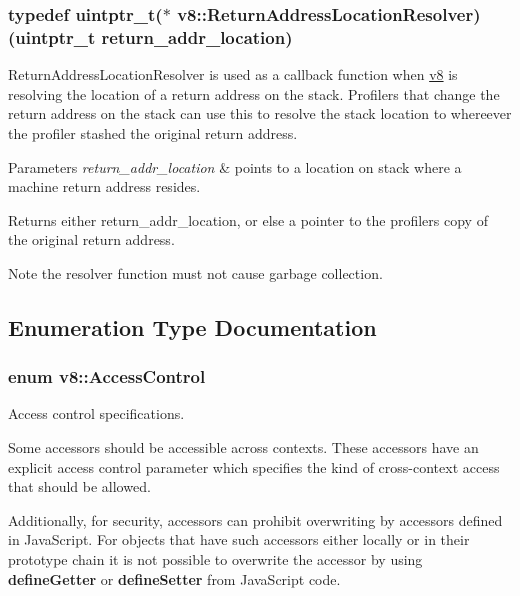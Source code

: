 \subsubsection[{Return\+Address\+Location\+Resolver}]{\setlength{\rightskip}{0pt plus 5cm}typedef uintptr\+\_\+t($\ast$ v8\+::\+Return\+Address\+Location\+Resolver) (uintptr\+\_\+t return\+\_\+addr\+\_\+location)}\label{namespacev8_a8ce54c75241be41ff6a25e9944eefd2a}
Return\+Address\+Location\+Resolver is used as a callback function when \hyperlink{namespacev8}{v8} is resolving the location of a return address on the stack. Profilers that change the return address on the stack can use this to resolve the stack location to whereever the profiler stashed the original return address.


\begin{DoxyParams}{Parameters}
{\em return\+\_\+addr\+\_\+location} & points to a location on stack where a machine return address resides. \\
\hline
\end{DoxyParams}
\begin{DoxyReturn}{Returns}
either return\+\_\+addr\+\_\+location, or else a pointer to the profiler\textquotesingle{}s copy of the original return address.
\end{DoxyReturn}
\begin{DoxyNote}{Note}
the resolver function must not cause garbage collection. 
\end{DoxyNote}


\subsection{Enumeration Type Documentation}
\hypertarget{namespacev8_a31d8355cb043d7d2dda3f4a52760b64e}{}
\subsubsection[{Access\+Control}]{\setlength{\rightskip}{0pt plus 5cm}enum {\bf v8\+::\+Access\+Control}}\label{namespacev8_a31d8355cb043d7d2dda3f4a52760b64e}
Access control specifications.

Some accessors should be accessible across contexts. These accessors have an explicit access control parameter which specifies the kind of cross-\/context access that should be allowed.

Additionally, for security, accessors can prohibit overwriting by accessors defined in Java\+Script. For objects that have such accessors either locally or in their prototype chain it is not possible to overwrite the accessor by using {\bfseries define\+Getter} or {\bfseries define\+Setter} from Java\+Script code. \hypertarget{namespacev8_add8bef6469c5b94706584124e610046c}{}
